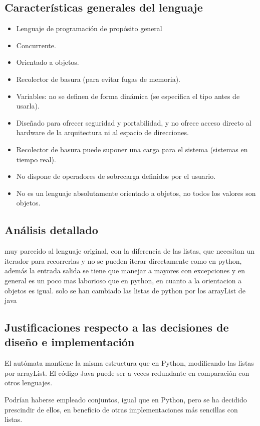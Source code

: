 \documentclass[12pt,a4paper]{article}
\begin{document}
    \subsection{Características generales del lenguaje}
    \begin{itemize}
    \item Lenguaje de programación de propósito general
    \item Concurrente.
    \item Orientado a objetos.
    \item Recolector de basura (para evitar fugas de memoria).
    \item Variables: no se definen de forma dinámica (se especifica el tipo antes de 
    usarla).
    \item Diseñado para ofrecer seguridad y portabilidad, y no ofrece acceso directo 
    al hardware de la arquitectura ni al espacio de direcciones.
    \item Recolector de basura puede suponer una carga para el sistema (sistemas en 
    tiempo real).
    \item No dispone de operadores de sobrecarga definidos por el usuario.
    \item No es un lenguaje absolutamente orientado a objetos, no todos los valores 
    son objetos.
    \end{itemize}
    
    \subsection{Análisis detallado}
    
    muy parecido al lenguaje original, con la diferencia de las listas, que necesitan un iterador para recorrerlas y no se pueden iterar
    directamente como en python, además la entrada salida se tiene que manejar a mayores con excepciones y en general es un poco mas laborioso que
    en python, en cuanto a la orientacion a objetos es igual. solo se han cambiado las listas de python por los arrayList de java
    \subsection{Justificaciones respecto a las decisiones de diseño e implementación}
El autómata mantiene la misma estructura que en Python, modificando las listas 
por arrayList. El código Java puede ser a veces redundante en comparación con 
otros lenguajes.

Podrían haberse empleado conjuntos, igual que en Python, pero se ha decidido 
prescindir de ellos, en beneficio de otras implementaciones más sencillas con 
listas.
\end{document}
